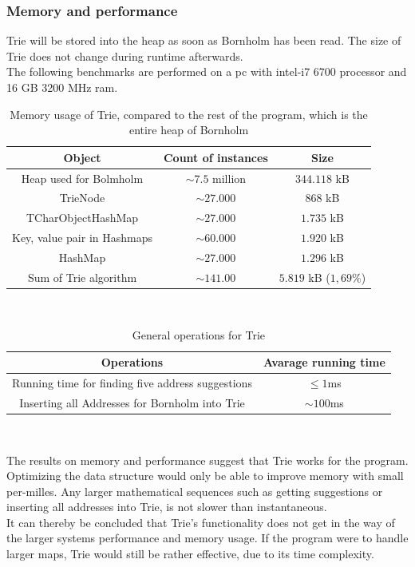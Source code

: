 \subsubsection{Memory and performance}
Trie will be stored into the heap as soon as Bornholm has been read. The size of Trie does not change during runtime afterwards.\\
The following benchmarks are performed on a pc with intel-i7 6700 processor and 16 GB 3200 MHz ram.
\begin{table}[ht]
  \centering
  \begin{tabular}{ c|c|c }
   \textbf{Object} & \textbf{Count of instances} & \textbf{Size}\\
   \hline
   Heap used for Bolmholm & $\sim7.5$ million & $344.118$ kB \\
   TrieNode & $\sim27.000$ & $868$ kB \\
   TCharObjectHashMap & $\sim27.000$ &  $1.735$ kB\\
   Key, value pair in Hashmaps & $\sim60.000$ & $1.920$ kB \\
   HashMap & $\sim27.000$ & $1.296$ kB\\
   Sum of Trie algorithm & $\sim141.00$ & $5.819$ kB ($1,69\%$)
  \end{tabular}\\
  \caption{\centering Memory usage of Trie, compared to the rest of the program, which is the entire heap of Bornholm}\label{Trie/memory}
\end{table}
\begin{table}[ht]
  \centering
  \begin{tabular}{ c|c }
   \textbf{Operations} & \textbf{Avarage running time}\\
   \hline
    Running time for finding five address suggestions & $\leq 1$ms\\
    Inserting all Addresses for Bornholm into Trie & $\sim 100$ms \\
  \end{tabular}\\
  \caption{\centering General operations for Trie}\label{Trie/operations}
\end{table}
The results on memory and performance suggest that Trie works for the program. 
\newpage
Optimizing the data structure would only be able to improve memory with small per-milles. Any larger mathematical sequences such as getting suggestions or inserting all addresses into Trie, is not slower than instantaneous. \\
It can thereby be concluded that Trie’s functionality does not get in the way of the larger systems performance and memory usage. If the program were to handle larger maps, Trie would still be rather effective, due to its time complexity.

